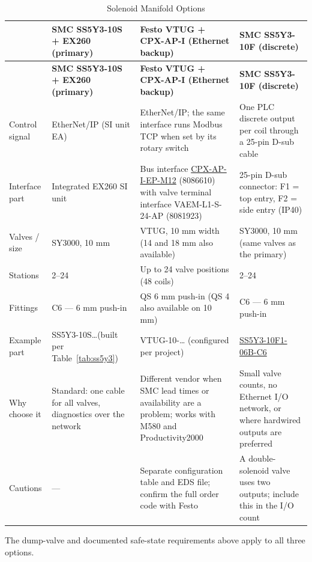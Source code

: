 \begin{longtable}{@{}P{2.53cm}P{4.66cm}P{4.66cm}P{4.66cm}@{}}
\caption{Solenoid Manifold Options}\label{tab:solenoid-options} \\
\toprule
{} & \textbf{SMC SS5Y3-10S + EX260 (primary)} & \textbf{Festo VTUG + CPX-AP-I (Ethernet backup)} & \textbf{SMC SS5Y3-10F (discrete)} \\
\midrule
\endfirsthead
\toprule
{} & \textbf{SMC SS5Y3-10S + EX260 (primary)} & \textbf{Festo VTUG + CPX-AP-I (Ethernet backup)} & \textbf{SMC SS5Y3-10F (discrete)} \\
\midrule
\endhead
Control signal & EtherNet/IP (SI unit EA) & EtherNet/IP; the same interface runs Modbus TCP when set by its rotary switch & One PLC discrete output per coil through a 25-pin D-sub cable \\
Interface part & Integrated EX260 SI unit & Bus interface \href{https://ftp.festo.com/Public/PNEUMATIC/SOFTWARE_SERVICE/Datasheet/EN_US/8086610.pdf}{CPX-AP-I-EP-M12} (8086610) with valve terminal interface VAEM-L1-S-24-AP (8081923) & 25-pin D-sub connector: F1 = top entry, F2 = side entry (IP40) \\
Valves / size & SY3000, 10 mm & VTUG, 10 mm width (14 and 18 mm also available) & SY3000, 10 mm (same valves as the primary) \\
Stations & 2--24 & Up to 24 valve positions (48 coils) & 2--24 \\
Fittings & C6 --- 6 mm push-in & QS 6 mm push-in (QS 4 also available on 10 mm) & C6 --- 6 mm push-in \\
Example part & SS5Y3-10S\ldots (built per Table~\ref{tab:ss5y3}) & VTUG-10-\ldots{} (configured per project) & \href{https://esd.equipment/en/FL-SS5Y3-10F1-06B-C6.html}{SS5Y3-10F1-06B-C6} \\
Why choose it & Standard: one cable for all valves, diagnostics over the network & Different vendor when SMC lead times or availability are a problem; works with M580 and Productivity2000 & Small valve counts, no Ethernet I/O network, or where hardwired outputs are preferred \\
Cautions & --- & Separate configuration table and EDS file; confirm the full order code with Festo & A double-solenoid valve uses two outputs; include this in the I/O count \\
\bottomrule
\end{longtable}
The dump-valve and documented safe-state requirements above apply to all three options.

